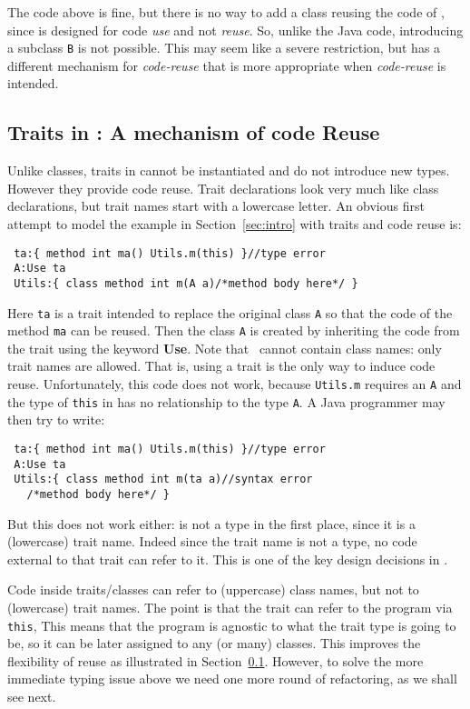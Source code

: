 The \name code above is fine, but there is no way to add a class 
\Q@B@ reusing the code of \Q@A@, since
\Q@A@ is designed for code \emph{use} and not \emph{reuse}. So, unlike
the Java code, introducing a subclass
\lstinline{B} is not possible. This may seem like a severe restriction, but
\name has a different mechanism for \emph{code-reuse} that 
is more appropriate when \emph{code-reuse} is intended. 

\subsection{Traits in \name: A mechanism of code Reuse}

Unlike classes, traits in \name cannot be instantiated and do not introduce new
types. However they provide code reuse.
Trait declarations 
look very much like class declarations, but trait names 
start with a lowercase letter. An obvious first attempt 
to model the example in Section~\ref{sec:intro} 
with traits and code reuse is:
\saveSpace
\begin{lstlisting}
 ta:{ method int ma() Utils.m(this) }//type error
 A:Use ta
 Utils:{ class method int m(A a)/*method body here*/ }
\end{lstlisting}
\saveSpace
\noindent Here \lstinline{ta} is a trait intended to replace the
original class \lstinline{A} so that the code of the method
\lstinline{ma} can be reused. Then the class \lstinline{A} 
is created by inheriting the code from the trait using the keyword 
{\bf Use}. Note that \use\ cannot contain class names: only trait
names are allowed.
That is, using a trait is the only way to induce code reuse.
Unfortunately, this code does not work, 
because \lstinline{Utils.m} requires an \lstinline{A} and the type of \lstinline{this} in
\Q@ta@ has no relationship to the type \lstinline{A}.
A Java programmer may then try to write:
\saveSpace
\begin{lstlisting}
 ta:{ method int ma() Utils.m(this) }//type error
 A:Use ta
 Utils:{ class method int m(ta a)//syntax error
   /*method body here*/ }
\end{lstlisting}
\saveSpace
But this does not work either: \Q@ta@ is not a type in the first place, since it is a (lowercase) trait name.
Indeed
since the trait name is not a type, no code external to that trait can
refer to it. This is one of the key design decisions in \name. 

Code inside traits/classes can refer to (uppercase) class names, but not to (lowercase) trait names.
The point is that the trait can refer to the program via \lstinline{this},
 This means that the
program is agnostic to what the trait type is going to be, so it can
be later assigned to any (or many) classes. This improves the
flexibility of reuse as illustrated in Section~\ref{}.
However, 
to solve the more immediate typing issue above we need one more round of refactoring, as we shall see next. 


